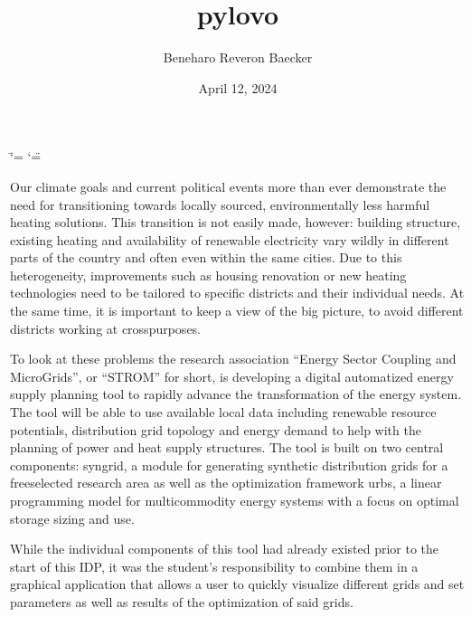 \documentclass[letterpaper,10pt,english]{sphinxmanual}
\title{pylovo}
\date{April 12, 2024}
\author{Beneharo Reveron Baecker}
\begin{document}
\ifdefined\shorthandoff
  \ifnum\catcode`\=\string=\active\shorthandoff{=}\fi
  \ifnum\catcode`\"=\active{}\fi
\fi

\pagestyle{empty}
\sphinxmaketitle
\pagestyle{plain}
\sphinxtableofcontents
\pagestyle{normal}
\label{\detokenize{index::doc}}


\begin{DUlineblock}{0em}
\item[] Our climate goals and current political events more than ever demonstrate the need for transitioning towards locally sourced,
environmentally less harmful heating solutions.
This transition is not easily made, however: building structure, existing heating and availability of renewable electricity vary wildly in
different parts of the country and often even within the same cities. Due to this heterogeneity, improvements such as housing renovation
or new heating technologies need to be tailored to specific districts and their individual needs. At the same time, it is important to
keep a view of the big picture, to avoid different districts working at cross\sphinxhyphen{}purposes.
\end{DUlineblock}

\begin{DUlineblock}{0em}
\item[] To look at these problems the research association “Energy \sphinxhyphen{} Sector Coupling and Micro\sphinxhyphen{}Grids”, or “STROM” for short,
is developing a digital automatized energy supply planning tool to rapidly advance the transformation of the energy system.
The tool will be able to use available local data including renewable resource potentials, distribution grid topology and energy demand
to help with the planning of power and heat supply structures. The tool is built on two central components: syngrid, a module for
generating synthetic distribution grids for a free\sphinxhyphen{}selected research area as well as the optimization framework urbs, a linear programming
model for multi\sphinxhyphen{}commodity energy systems with a focus on optimal storage sizing and use.
\end{DUlineblock}

\begin{DUlineblock}{0em}
\item[] While the individual components of this tool had already existed prior to the start of this IDP, it was the student’s responsibility to
combine them in a graphical application that allows a user to quickly visualize different grids and set parameters as well as results
of the optimization of said grids.
\end{DUlineblock}
\end{document}
